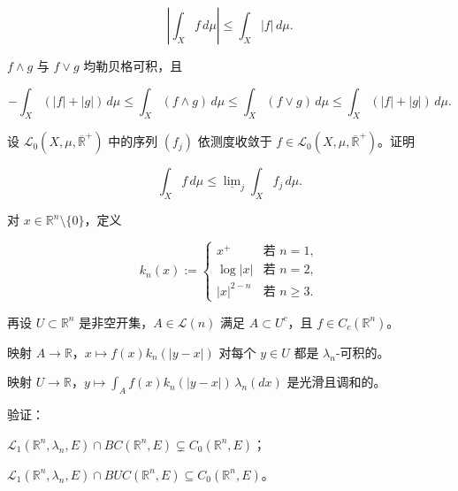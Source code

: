 \begin{exercises}
\begin{subitems}
\item

\[ \left| \int_X f\,d\mu \right| \le \int_X |f|\,d\mu . \]

\item

$ f \wedge g $ 与 $ f \vee g $ 均勒贝格可积，且

\[
- \int_X (|f| + |g|)\,d\mu \le \int_X (f \wedge g)\,d\mu \le \int_X (f \vee g)\,d\mu \le \int_X (|f| + |g|)\,d\mu .
\]
\end{subitems}

\item

设 $ \mathcal{L}_0(X,\mu,\overline{\mathbb{R}}^+) $ 中的序列 $ (f_j) $ 依测度收敛于 $ f \in \mathcal{L}_0(X,\mu,\overline{\mathbb{R}}^+) $。证明

\[
\int_X f\,d\mu \le \underline{\lim}_j \int_X f_j\,d\mu .
\]
\item

对 $ x \in \mathbb{R}^n \setminus \{0\} $，定义

\begin{equation*}
k_n(x) := \begin{cases} x^+ & \text{若 } n = 1, \\ \log|x| & \text{若 } n = 2, \\ |x|^{2-n} & \text{若 } n \ge 3. \end{cases}
\end{equation*}

再设 $ U \subset \mathbb{R}^n $ 是非空开集，$ A \in \mathcal{L}(n) $ 满足 $ A \subset U^c $，且 $ f \in C_c(\mathbb{R}^n) $。

\begin{items}
\item

映射 $ A \to \mathbb{R} $，$ x \mapsto f(x)k_n(|y-x|) $ 对每个 $ y \in U $ 都是 $ \lambda_n $-可积的。

\item

映射 $ U \to \mathbb{R} $，$ y \mapsto \int_A f(x)k_n(|y-x|)\,\lambda_n(dx) $ 是光滑且调和的。

\end{items}

\item

验证：

\begin{subitems}
\item

$ \mathcal{L}_1(\mathbb{R}^n,\lambda_n,E) \cap BC(\mathbb{R}^n,E) \subsetneq C_0(\mathbb{R}^n,E) $；

\item

$ \mathcal{L}_1(\mathbb{R}^n,\lambda_n,E) \cap BUC(\mathbb{R}^n,E) \subseteq C_0(\mathbb{R}^n,E) $。

\end{subitems}

\end{exercises}

